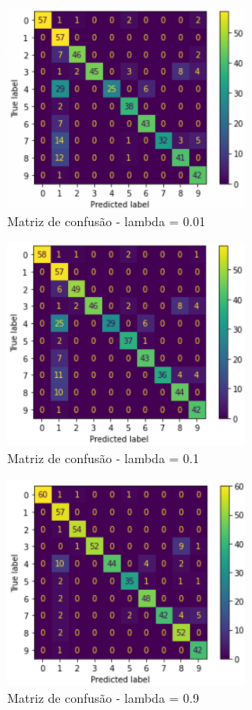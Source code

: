 \begin{figure}[H]
  \center
  \includegraphics[width=7cm]{images/img14.png}
  \caption{\label{img10}Matriz de confusão - lambda = 0.01}
\end{figure}


\begin{figure}[H]
  \center
  \includegraphics[width=7cm]{images/img15.png}
  \caption{\label{img11}Matriz de confusão - lambda = 0.1}
\end{figure}

\begin{figure}[H]
  \center
  \includegraphics[width=7cm]{images/img16.png}
  \caption{\label{igm12}Matriz de confusão - lambda = 0.9}
\end{figure}


